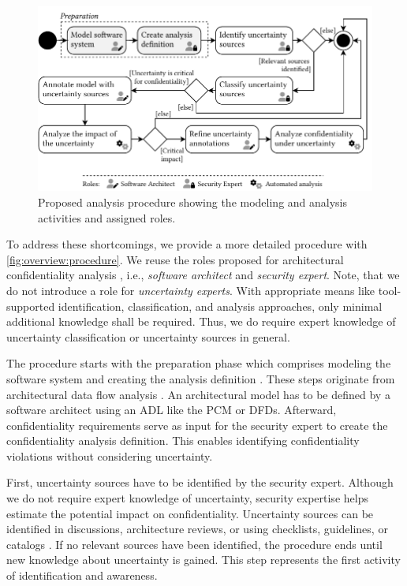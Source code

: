 \begin{figure}
    \centering
    \includegraphics[width=\textwidth]{figures/chapter4/overview-procedure.pdf}
    \caption{Proposed analysis procedure showing the modeling and analysis activities and assigned roles.}
    \label{fig:overview:procedure}
\end{figure}

To address these shortcomings, we provide a more detailed procedure with \autoref{fig:overview:procedure}.
We reuse the roles proposed for architectural confidentiality analysis \cite{seifermann_architectural_2022}, i.e., \emph{software architect} and \emph{security expert}.
Note, that we do not introduce a role for \emph{uncertainty experts}.
With appropriate means like tool-supported identification, classification, and analysis approaches, only minimal additional knowledge shall be required.
Thus, we do require expert knowledge of uncertainty classification or uncertainty sources in general.

The procedure starts with the preparation phase which comprises modeling the software system \cite{seifermann_data-driven_2019,seifermann_identifying_2021} and creating the analysis definition \cite{hahner_modeling_2021}.
These steps originate from architectural data flow analysis \cite{seifermann_architectural_2022}.
An architectural model has to be defined by a software architect using an \acf{ADL} like the \acf{PCM} or \acfp{DFD}.
Afterward, confidentiality requirements serve as input for the security expert to create the confidentiality analysis definition.
This enables identifying confidentiality violations without considering uncertainty.

First, uncertainty sources have to be identified by the security expert.
Although we do not require expert knowledge of uncertainty, security expertise helps estimate the potential impact on confidentiality.
Uncertainty sources can be identified in discussions, architecture reviews, or using checklists, guidelines, or catalogs \cite{hahner_arcn_2024}. 
If no relevant sources have been identified, the procedure ends until new knowledge about uncertainty is gained.
This step represents the first activity of identification and awareness. 

